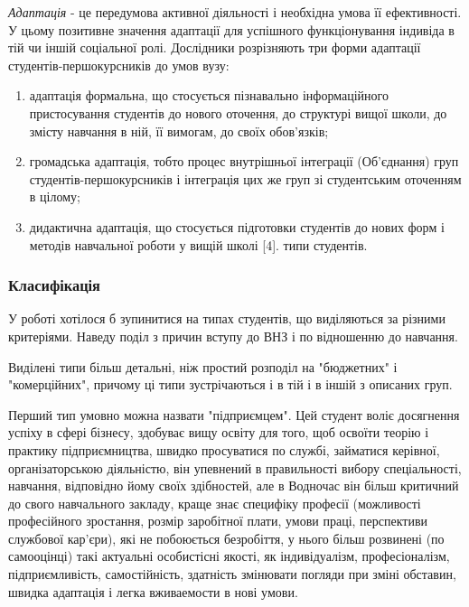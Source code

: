 \documentclass[a4paper,12pt, titlepage]{article}
\begin{document}
    \textit{Адаптація} - це передумова активної діяльності і необхідна
    умова її ефективності. У цьому позитивне значення адаптації для
    успішного функціонування індивіда в тій чи іншій соціальної ролі.
    Дослідники розрізняють три форми адаптації студентів-першокурсників
    до умов вузу:
    \begin{enumerate}
        \item адаптація формальна, що стосується пізнавально
        інформаційного пристосування студентів до нового оточення, до
        структурі вищої школи, до змісту навчання в ній, її вимогам, до
        своїх обов'язків;
        \item громадська адаптація, тобто процес внутрішньої інтеграції
        (Об'єднання) груп студентів-першокурсників і інтеграція цих же груп
        зі студентським оточенням в цілому;
        \item дидактична адаптація, що стосується підготовки студентів до
        нових форм і методів навчальної роботи у вищій школі [4].
        типи студентів.
    \end{enumerate}

    \subsubsection{Класифікація}
    У роботі хотілося б зупинитися на типах студентів,
    що виділяються за різними критеріями. Наведу поділ з причин
    вступу до ВНЗ і по відношенню до навчання.

    Виділені типи більш детальні, ніж
    простий розподіл на "бюджетних" і "комерційних", причому ці типи
    зустрічаються і в тій і в іншій з описаних груп.

    Перший тип умовно можна назвати "підприємцем". Цей студент
    воліє досягнення успіху в сфері бізнесу, здобуває вищу
    освіту для того, щоб освоїти теорію і практику
    підприємництва, швидко просуватися по службі, займатися
    керівної, організаторською діяльністю, він упевнений в правильності
    вибору спеціальності, навчання, відповідно йому своїх здібностей, але в
    Водночас він більш критичний до свого навчального закладу, краще знає
    специфіку професії (можливості професійного зростання, розмір
    заробітної плати, умови праці, перспективи службової кар'єри), які не
    побоюється безробіття, у нього більш розвинені (по самооцінці) такі
    актуальні особистісні якості, як індивідуалізм, професіоналізм,
    підприємливість, самостійність, здатність змінювати погляди при
    зміні обставин, швидка адаптація і легка вживаемости в нові
    умови.
\end{document}

